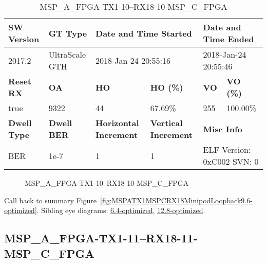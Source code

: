 \begin{table}[h]
\centering
\caption{MSP\_A\_FPGA-TX1-10--RX18-10-MSP\_C\_FPGA}
\label{tab:MSPAFPGATX110RX1810MSPCFPGA9.6-optimized}
\begin{tabular}{@{}|l|l|l|l|l|l|@{}}
\toprule
\textbf{SW Version}                & \textbf{GT Type}   & \multicolumn{2}{l|}{\textbf{Date and Time Started}}            & \multicolumn{2}{l|}{\textbf{Date and Time Ended}}        \\ \midrule
2017.2                       & UltraScale GTH          & \multicolumn{2}{l|}{2018-Jan-24 20:55:16}                   & \multicolumn{2}{l|}{2018-Jan-24 20:55:46}               \\ \midrule
\textbf{Reset RX}                  & \textbf{OA} & \textbf{HO}   & \textbf{HO (\%)} & \textbf{VO} & \textbf{VO (\%)} \\ \midrule
true & 9322        & 44          & 67.69\%        & 255        & 100.00\%       \\ \midrule
\textbf{Dwell Type}                & \textbf{Dwell BER} & \textbf{Horizontal Increment} & \textbf{Vertical Increment}    & \multicolumn{2}{l|}{\textbf{Misc Info}}                  \\ \midrule
BER                            & 1e-7        & 1        & 1           & \multicolumn{2}{l|}{ELF Version: 0xC002 SVN: 0}                         \\ \bottomrule
\end{tabular}
\end{table}

\begin{figure}[h]
\caption{MSP\_A\_FPGA-TX1-10--RX18-10-MSP\_C\_FPGA} \label{fig:MSPAFPGATX110RX1810MSPCFPGA9.6-optimized}
\end{figure}

Call back to summary Figure~\ref{fig:MSPATX1MSPCRX18MinipodLoopback9.6-optimized}.
Sibling eye diagrams: \hyperref[sec:MSPAFPGATX110RX1810MSPCFPGA6.4-optimized]{6.4-optimized}, \hyperref[sec:MSPAFPGATX110RX1810MSPCFPGA12.8-optimized]{12.8-optimized}.

\clearpage
\newpage


\subsection{MSP\_A\_FPGA-TX1-11--RX18-11-MSP\_C\_FPGA}\label{sec:MSPAFPGATX111RX1811MSPCFPGA9.6-optimized}

